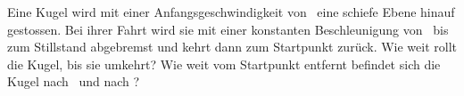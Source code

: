 Eine Kugel wird mit einer Anfangsgeschwindigkeit von \vKaO\ eine schiefe Ebene hinauf gestossen. Bei ihrer Fahrt wird sie mit einer konstanten Beschleunigung von \aKO\ bis zum Stillstand abgebremst und kehrt dann zum Startpunkt zurück. Wie weit rollt die Kugel, bis sie umkehrt? Wie weit vom Startpunkt entfernt befindet sich die Kugel nach \tKaO\ und nach \tKbO?
